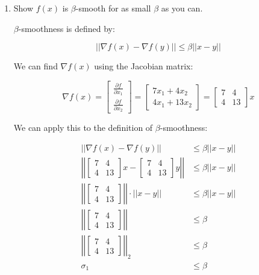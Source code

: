 \documentclass[11pt]{article}
\theoremstyle{definition}
\theoremstyle{case}
\theoremstyle{theorem}
\begin{document}
\begin{enumerate}[label=(\alph*)]

\item Show $f(x)$ is $\beta$-smooth for as small $\beta$ as you can.

$\beta$-smoothness is defined by: 

\[
  || \nabla f(x) - \nabla f(y) || \leq \beta ||x - y|| 
\]

We can find $\nabla f(x)$ using the Jacobian matrix:

\[
  \nabla f(x) = \left[ \begin{matrix} \frac{\partial f}{\partial x_1} \\ \frac{\partial f}{\partial x_2} \end{matrix} \right] 
              = \left[ \begin{matrix} 7x_1 + 4x_2 \\ 4x_1 + 13x_2 \end{matrix} \right] 
              = \left[ \begin{matrix} 7 & 4 \\ 4 & 13 \end{matrix}\right] x
\]

We can apply this to the definition of $\beta$-smoothness:

\begin{align*}
  || \nabla f(x) - \nabla f(y) || &\leq \beta ||x - y|| \\
  \left|\left| \left[ \begin{matrix} 7 & 4 \\ 4 & 13 \end{matrix}\right] x - \left[ \begin{matrix} 7 & 4 \\ 4 & 13 \end{matrix}\right] y \right|\right| &\leq \beta ||x - y|| \\
  \left|\left| \left[ \begin{matrix} 7 & 4 \\ 4 & 13 \end{matrix}\right] \right|\right| \cdot || x - y || &\leq \beta ||x - y|| \\
  \left|\left| \left[ \begin{matrix} 7 & 4 \\ 4 & 13 \end{matrix}\right] \right|\right| &\leq \beta \\
  \left|\left| \left[ \begin{matrix} 7 & 4 \\ 4 & 13 \end{matrix}\right] \right|\right|_2 &\leq \beta \\
  \sigma_1 &\leq \beta
\end{align*}


\end{enumerate}
\end{document}

